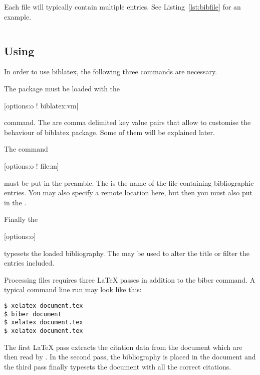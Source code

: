 Each  file will typically contain multiple entries. See
Listing~\ref{lst:bibfile} for an example.

\begin{listing}[htp]
  \begin{lined}{\textwidth}
    \inputminted{bibtex}{src/examples/example.bib}
  \end{lined}
  \caption[An example of bibliography database]{An example bibliography
    database for  ( file)}\label{lst:bibfile}
\end{listing}

\subsection{Using }

In order to use biblatex, the following three commands are necessary.

The  package must be loaded with the
\begin{lscommand}
  [options:o ! biblatex:vm]
\end{lscommand}
command. The  are comma delimited key value pairs that allow to
customise the behaviour of biblatex package. Some of them will be explained
later.

The command
\begin{lscommand}
  [options:o ! file:m]
\end{lscommand}
must be put in the preamble. The  is the name of the  file
containing bibliographic entries. You may also specify a remote location here,
but then you must also put  in the .

Finally the
\begin{lscommand}
  [options:o]
\end{lscommand}
typesets the loaded bibliography. The  may be used to alter the
title or filter the entries included.

Processing files requires three \LaTeX{} passes in addition to the biber
command. A typical command line run may look like this:
\begin{code}
\begin{verbatim}
$ xelatex document.tex
$ biber document
$ xelatex document.tex
$ xelatex document.tex
\end{verbatim}
\end{code}
The first \LaTeX{} pass extracts the citation data from the document which are
then read by . In the second pass, the bibliography is placed in the
document and the third pass finally typesets the document with all the correct citations.

